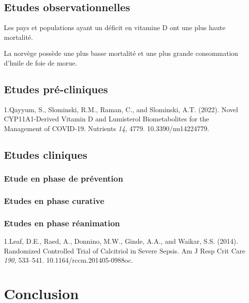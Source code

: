 \documentclass[
  a4paper,
  DIV=11,
  numbers=noendperiod,
  listof=totoc]{scrreprt}
\begin{document}
\textcite{Bishop.2021}

\hypertarget{etudes-observationnelles}{%
\section{Etudes observationnelles}\label{etudes-observationnelles}}

\textcite{Bishop.2021}

Les pays et populations ayant un déficit en vitamine D ont une plus
haute mortalité.

La norvège possède une plus basse mortalité et une plus grande
consommation d'huile de foie de morue.

\hypertarget{etudes-pruxe9-cliniques}{%
\section{Etudes pré-cliniques}\label{etudes-pruxe9-cliniques}}

1.Qayyum, S., Slominski, R.M., Raman, C., and Slominski, A.T. (2022).
Novel CYP11A1-Derived Vitamin D and Lumisterol Biometabolites for the
Management of COVID-19. Nutrients \emph{14}, 4779. 10.3390/nu14224779.

\hypertarget{etudes-cliniques}{%
\section{Etudes cliniques}\label{etudes-cliniques}}

\hypertarget{etude-en-phase-de-pruxe9vention}{%
\subsection{Etude en phase de
prévention}\label{etude-en-phase-de-pruxe9vention}}

\hypertarget{etudes-en-phase-curative}{%
\subsection{Etudes en phase curative}\label{etudes-en-phase-curative}}

\hypertarget{etudes-en-phase-ruxe9animation}{%
\subsection{Etudes en phase
réanimation}\label{etudes-en-phase-ruxe9animation}}

1.Leaf, D.E., Raed, A., Donnino, M.W., Ginde, A.A., and Waikar, S.S.
(2014). Randomized Controlled Trial of Calcitriol in Severe Sepsis. Am J
Resp Crit Care \emph{190}, 533--541. 10.1164/rccm.201405-0988oc.

\newpage{}

\hypertarget{conclusion}{%
\chapter{Conclusion}\label{conclusion}}

\newpage{}


\printbibliography[title=Bibliographie]
\end{document}
